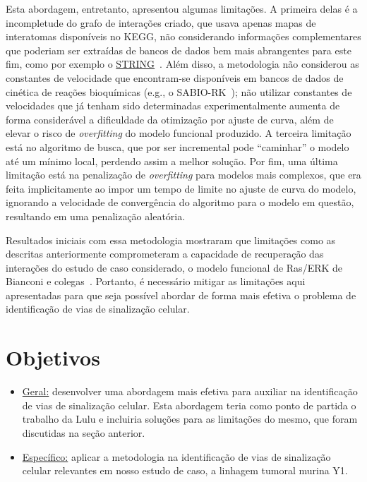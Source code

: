 \documentclass[12pt]{article}
\begin{document}
Esta abordagem, entretanto, apresentou algumas limitações. A primeira delas é a incompletude do grafo de interações criado, que usava apenas mapas de interatomas disponíveis no KEGG, não considerando informações complementares que poderiam ser extraídas de bancos de dados bem mais abrangentes para este fim, como por exemplo o \href{https://string-db.org/}{STRING}~\cite{szklarczyk2010string}. Além disso, a metodologia não considerou as constantes de velocidade que encontram-se disponíveis em bancos de dados de cinética de reações bioquímicas (e.g., o SABIO-RK~\cite{doi:10.1093/nar/gkr1046}); não utilizar constantes de velocidades que já tenham sido determinadas experimentalmente aumenta de forma considerável a dificuldade da otimização por ajuste de curva, além de elevar o risco de {\em overfitting} do modelo funcional produzido. A terceira limitação está no algoritmo de busca, que por ser incremental pode ``caminhar'' o modelo até um mínimo local, perdendo assim a melhor solução. Por fim, uma última limitação está na penalização de {\em overfitting} para modelos mais complexos, que era feita implicitamente ao impor um tempo de limite no ajuste de curva do modelo, ignorando a velocidade de convergência do algoritmo para o modelo em questão, resultando em uma penalização aleatória.

Resultados iniciais com essa metodologia mostraram que limitações como as descritas anteriormente comprometeram a capacidade de recuperação das interações do estudo de caso considerado, o modelo funcional de Ras/ERK de Bianconi e colegas~\cite{Wu2015metodo,bianconi2012computational}. Portanto, é necessário mitigar as limitações aqui apresentadas para que seja possível abordar de forma mais efetiva o problema de identificação de vias de sinalização celular.


\section{Objetivos}

\begin{itemize}

\item \underline{Geral:} desenvolver uma abordagem mais efetiva para auxiliar na identificação de vias de sinalização celular. Esta abordagem teria como ponto de partida o trabalho da Lulu e incluiria soluções para as limitações do mesmo, que foram discutidas na seção anterior.

\item \underline{Específico:} aplicar a metodologia na identificação de vias de sinalização celular relevantes em nosso estudo de caso, a linhagem tumoral murina Y1.

\end{itemize}
\end{document}
